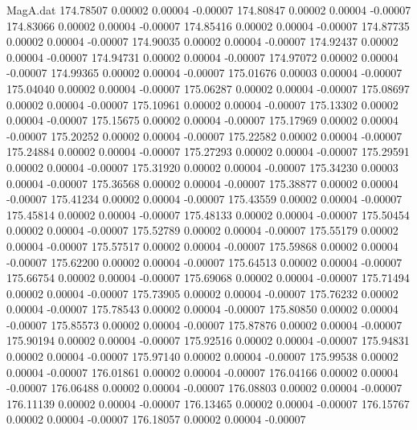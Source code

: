 \begin{filecontents}{MagA.dat}
 174.78507    0.00002    0.00004   -0.00007
 174.80847    0.00002    0.00004   -0.00007
 174.83066    0.00002    0.00004   -0.00007
 174.85416    0.00002    0.00004   -0.00007
 174.87735    0.00002    0.00004   -0.00007
 174.90035    0.00002    0.00004   -0.00007
 174.92437    0.00002    0.00004   -0.00007
 174.94731    0.00002    0.00004   -0.00007
 174.97072    0.00002    0.00004   -0.00007
 174.99365    0.00002    0.00004   -0.00007
 175.01676    0.00003    0.00004   -0.00007
 175.04040    0.00002    0.00004   -0.00007
 175.06287    0.00002    0.00004   -0.00007
 175.08697    0.00002    0.00004   -0.00007
 175.10961    0.00002    0.00004   -0.00007
 175.13302    0.00002    0.00004   -0.00007
 175.15675    0.00002    0.00004   -0.00007
 175.17969    0.00002    0.00004   -0.00007
 175.20252    0.00002    0.00004   -0.00007
 175.22582    0.00002    0.00004   -0.00007
 175.24884    0.00002    0.00004   -0.00007
 175.27293    0.00002    0.00004   -0.00007
 175.29591    0.00002    0.00004   -0.00007
 175.31920    0.00002    0.00004   -0.00007
 175.34230    0.00003    0.00004   -0.00007
 175.36568    0.00002    0.00004   -0.00007
 175.38877    0.00002    0.00004   -0.00007
 175.41234    0.00002    0.00004   -0.00007
 175.43559    0.00002    0.00004   -0.00007
 175.45814    0.00002    0.00004   -0.00007
 175.48133    0.00002    0.00004   -0.00007
 175.50454    0.00002    0.00004   -0.00007
 175.52789    0.00002    0.00004   -0.00007
 175.55179    0.00002    0.00004   -0.00007
 175.57517    0.00002    0.00004   -0.00007
 175.59868    0.00002    0.00004   -0.00007
 175.62200    0.00002    0.00004   -0.00007
 175.64513    0.00002    0.00004   -0.00007
 175.66754    0.00002    0.00004   -0.00007
 175.69068    0.00002    0.00004   -0.00007
 175.71494    0.00002    0.00004   -0.00007
 175.73905    0.00002    0.00004   -0.00007
 175.76232    0.00002    0.00004   -0.00007
 175.78543    0.00002    0.00004   -0.00007
 175.80850    0.00002    0.00004   -0.00007
 175.85573    0.00002    0.00004   -0.00007
 175.87876    0.00002    0.00004   -0.00007
 175.90194    0.00002    0.00004   -0.00007
 175.92516    0.00002    0.00004   -0.00007
 175.94831    0.00002    0.00004   -0.00007
 175.97140    0.00002    0.00004   -0.00007
 175.99538    0.00002    0.00004   -0.00007
 176.01861    0.00002    0.00004   -0.00007
 176.04166    0.00002    0.00004   -0.00007
 176.06488    0.00002    0.00004   -0.00007
 176.08803    0.00002    0.00004   -0.00007
 176.11139    0.00002    0.00004   -0.00007
 176.13465    0.00002    0.00004   -0.00007
 176.15767    0.00002    0.00004   -0.00007
 176.18057    0.00002    0.00004   -0.00007

\end{filecontents}
